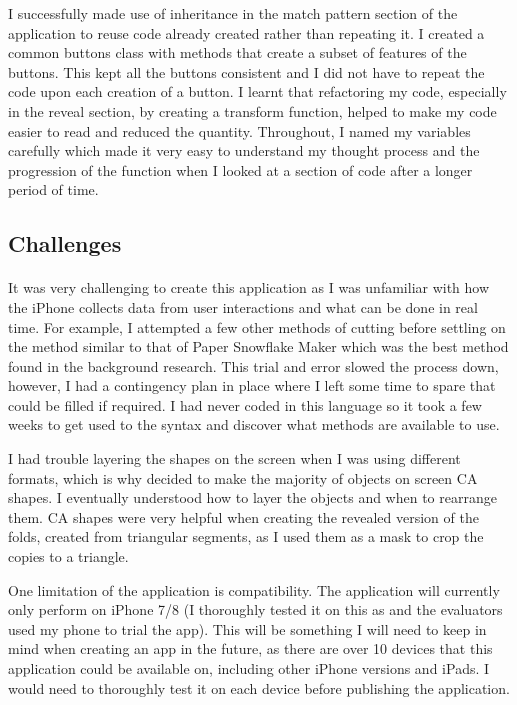\documentclass[11pt]{article}
\begin{document}
        I successfully made use of inheritance in the match pattern section of the application to reuse code already created rather than repeating it. I created a common buttons class with methods that create a subset of features of the buttons. This kept all the buttons consistent and I did not have to repeat the code upon each creation of a button. I learnt that refactoring my code, especially in the reveal section, by creating a transform function, helped to make my code easier to read and reduced the quantity. Throughout, I named my variables carefully which made it very easy to understand my thought process and the progression of the function when I looked at a section of code after a longer period of time. 
        
    \subsection{Challenges}
    
        \paragraph{}
        It was very challenging to create this application as I was unfamiliar with how the iPhone collects data from user interactions and what can be done in real time. For example, I attempted a few other methods of cutting before settling on the method similar to that of Paper Snowflake Maker which was the best method found in the background research. This trial and error slowed the process down, however, I had a contingency plan in place where I left some time to spare that could be filled if required. I had never coded in this language so it took a few weeks to get used to the syntax and discover what methods are available to use.
        
        I had trouble layering the shapes on the screen when I was using different formats, which is why decided to make the majority of objects on screen CA shapes. I eventually understood how to layer the objects and when to rearrange them. CA shapes were very helpful when creating the revealed version of the folds, created from triangular segments, as I used them as a mask to crop the copies to a triangle.
        
        One limitation of the application is compatibility. The application will currently only perform on iPhone 7/8 (I thoroughly tested it on this as and the evaluators used my phone to trial the app). This will be something I will need to keep in mind when creating an app in the future, as there are over 10 devices that this application could be available on, including other iPhone versions and iPads. I would need to thoroughly test it on each device before publishing the application. 
            
\end{document}
